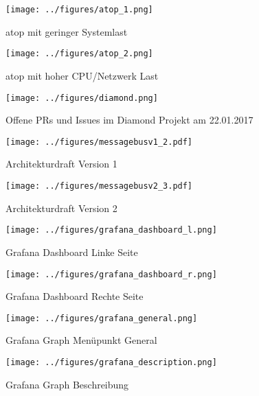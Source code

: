\begin{figure}[tbph]
  \centering
  \texttt{[image: ../figures/atop\_1.png]}
  \caption{atop mit geringer Systemlast}
\label{figure:atop1}
\end{figure}

\begin{figure}[tbp]
  \centering
  \texttt{[image: ../figures/atop\_2.png]}
  \caption{atop mit hoher CPU/Netzwerk Last}
\label{figure:atop2}
\end{figure}

\begin{figure}[tbp]
  \centering
  \texttt{[image: ../figures/diamond.png]}
  \caption{Offene PRs und Issues im Diamond Projekt am 22.01.2017}
\label{figure:diamond}
\end{figure}

\begin{figure}[tbp]
  \centering
  \texttt{[image: ../figures/messagebusv1\_2.pdf]}
  \caption{Architekturdraft Version 1}
\label{figure:draft1}
\end{figure}
\begin{figure}[tbp]
  \centering
  \texttt{[image: ../figures/messagebusv2\_3.pdf]}
  \caption{Architekturdraft Version 2}
\label{figure:draft2}
\end{figure}
\FloatBarrier{}

\begin{figure}[tbp]
  \centering
  \texttt{[image: ../figures/grafana\_dashboard\_l.png]}
  \caption{Grafana Dashboard Linke Seite}
\label{figure:grafana_dashboard_l}
\end{figure}

\begin{figure}[tbp]
  \centering
  \texttt{[image: ../figures/grafana\_dashboard\_r.png]}
  \caption{Grafana Dashboard Rechte Seite}
\label{figure:grafana_dashboard_r}
\end{figure}

\begin{figure}[tbp]
  \centering
  \texttt{[image: ../figures/grafana\_general.png]}
  \caption{Grafana Graph Menüpunkt General}
\label{figure:grafana_general}
\end{figure}

\begin{figure}[tbp]
  \centering
  \texttt{[image: ../figures/grafana\_description.png]}
  \caption{Grafana Graph Beschreibung}
\label{figure:grafana_description}
\end{figure}

